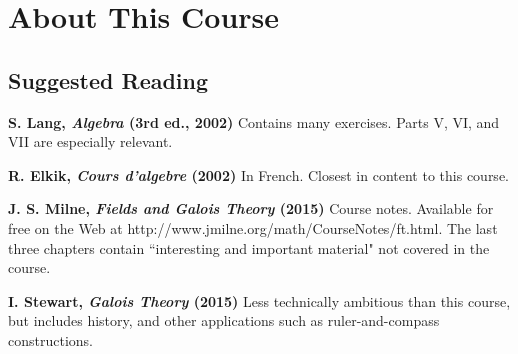 \section{About This Course}
\label{sec:AboutThisCourse}

\subsection{Suggested Reading}
\label{sec:SuggestedReading}

\textbf{S. Lang, \emph{Algebra} (3rd ed., 2002)}
\label{sec:Lang}
Contains many exercises. Parts V, VI, and VII are especially relevant.

\textbf{R. Elkik, \emph{Cours d'algebre} (2002)}
\label{sec:Elkik}
In French. Closest in content to this course.

\textbf{J. S. Milne, \emph{Fields and Galois Theory} (2015)}
\label{sec:Milne}
Course notes. Available for free on the Web at http://www.jmilne.org/math/CourseNotes/ft.html. The last three chapters contain ``interesting and important material" not covered in the course. 

\textbf{I. Stewart, \emph{Galois Theory} (2015)}
\label{sec:Stewart}
Less technically ambitious than this course, but includes history, and other applications such as ruler-and-compass constructions.